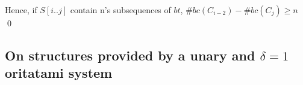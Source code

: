 Hence, if $S[i..j]$ contain n's subsequences of $bt$, $\#bc(C_{i-2}) - \#bc(C_{j}) \geq n$
\qed








\subsection{On structures provided by a unary and $\delta = 1$ oritatami system}

%      
%
%


%



